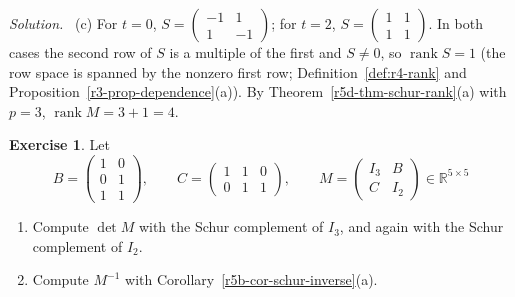 \documentclass[12pt]{article}
\newcommand{\R}{\mathbb R}
\DeclareMathOperator{\rank}{rank}
\theoremstyle{definition}
\newtheorem{exercise}{Exercise}
\newenvironment{solution}{\par\noindent\textit{Solution.}\ }{\par\smallskip}
\begin{document}
\begin{solution}
(c) For \(t=0\), \(S=\left(\begin{smallmatrix}-1&1\\1&-1\end{smallmatrix}\right)\); for \(t=2\),
\(S=\left(\begin{smallmatrix}1&1\\1&1\end{smallmatrix}\right)\). In both cases the second row of \(S\) is
a multiple of the first and \(S\ne0\), so \(\rank S=1\) (the row space is spanned by the nonzero first row;
Definition~\ref{def:r4-rank} and Proposition~\ref{r3-prop-dependence}(a)). By Theorem~\ref{r5d-thm-schur-rank}(a)
with \(p=3\), \(\rank M=3+1=4\).
\end{solution}

\begin{exercise}\label{r5d-ex-schur-nonsquare}
Let
\[
B=\begin{pmatrix}1&0\\0&1\\1&1\end{pmatrix},\qquad C=\begin{pmatrix}1&1&0\\0&1&1\end{pmatrix},\qquad
M=\begin{pmatrix}I_3&B\\C&I_2\end{pmatrix}\in\R^{5\times5}
\]
\begin{enumerate}
\item Compute \(\det M\) with the Schur complement of \(I_3\), and again with the Schur complement of
\(I_2\).
\item Compute \(M^{-1}\) with Corollary~\ref{r5b-cor-schur-inverse}(a).
\end{enumerate}
\end{exercise}
\end{document}
